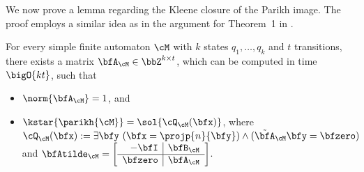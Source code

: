 We now prove a  lemma regarding the Kleene closure of the Parikh image.
The proof employs a similar idea as in the argument for Theorem~1 in \cite{tree}.

\begin{lemma}\label{lem:kstar_nfa}
    For every simple finite automaton $\cM$ with $k$ states $q_1, \ldots,q_k$ and $t$ transitions,
    there exists a matrix $\bfA_\cM \in \bbZ^{k \times t}$,
    which can be computed in time $\bigO{kt}$,
    such that
    \begin{itemize}
        \item $\norm{\bfA_\cM} = 1$, and
        \item $\kstar{\parikh{\cM}} =
            \sol{\cQ_\cM(\bfx)}$,
            where
            $\cQ_\cM(\bfx) := \exists \bfy\ (\bfx = \projp{n}{\bfy}) \land (\tilde{\bfA}_\cM \bfy = \bfzero)$ and
            $\bfAtilde_\cM = 
            \left[
                \begin{array}{r|r}
                    -\bfI & \bfB_\cM \\
                    \hline
                    \bfzero& \bfA_\cM
                \end{array}
            \right]$.
    \end{itemize}
\end{lemma}

